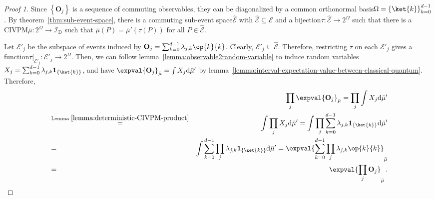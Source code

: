 \documentclass[12pt]{iopart}
\theoremstyle{plain}
\theoremstyle{definition}
\theoremstyle{remark}
\newcommand{\events}{\ensuremath{\mathcal{E}}}
\newcommand{\proj}[1]{\op{#1}{#1}}
\newcommand{\nb}{\nolinebreak[3] }
\begin{document}
\begin{proof}[Proof 1]Since $\left\{ \mathbf{O}_{j}\right\} $ is
a sequence of commuting observables, they can be diagonalized by a
common orthonormal basis\nb$\Omega=\left\{ \ket{k}\right\} _{k=0}^{d-1}$.
By theorem~\ref{thm:sub-event-space}, there is a commuting sub-event
space\nb$\widehat{\events}$ with $\widehat{\events}\subseteq\events$
and a bijection\nb$\tau:\widehat{\events}\rightarrow2^{\Omega}$
such that there is a CIVPM\nb$\bar{\mu}:2^{\Omega}\rightarrow\mathscr{I}_{\mathrm{D}}$
such that $\bar{\mu}\left(P\right)=\bar{\mu}'\left(\tau\left(P\right)\right)$
for all $P\in\widehat{\events}$.

Let $\events'_{j}$ be the subspace of events induced by $\mathbf{O}_{j}=\sum_{k=0}^{d-1}\lambda_{j,k}\proj{k}$.
Clearly, $\events'_{j}\subseteq\widehat{\events}$. Therefore, restricting
$\tau$ on each $\events'_{j}$ gives a function\nb$\tau|_{\events'_{j}}:\events'_{j}\rightarrow2^{\Omega}$.
Then, we can follow lemma~\ref{lemma:observable2random-variable}
to induce random variables\nb$X_{j}=\sum_{k=0}^{d-1}\lambda_{j,k}\mathbf{1}_{\left\{ \ket{k}\right\} }$,
and have $\expval{\mathbf{O}_{j}}_{\bar{\mu}}=\int X_{j}\rmd\bar{\mu}'$
by lemma~\ref{lemma:interval-expectation-value-between-classical-quantum}.
Therefore, 
\begin{eqnarray*}
 &  & \prod_{j}\expval{\mathbf{O}_{j}}_{\bar{\mu}}=\prod_{j}\int X_{j}\rmd\bar{\mu}'\\
 & \stackrel{\textrm{Lemma }\ref{lemma:deterministic-CIVPM-product}}{=} & \int\prod_{j}X_{j}\rmd\bar{\mu}'=\int\prod_{j}\sum_{k=0}^{d-1}\lambda_{j,k}\mathbf{1}_{\left\{ \ket{k}\right\} }\rmd\bar{\mu}'\\
 & = & \int\sum_{k=0}^{d-1}\prod_{j}\lambda_{j,k}\mathbf{1}_{\left\{ \ket{k}\right\} }\rmd\bar{\mu}'=\expval{\sum_{k=0}^{d-1}\prod_{j}\lambda_{j,k}\proj{k}}_{\bar{\mu}}\\
 & = & \expval{\prod_{j}\mathbf{O}_{j}}_{\bar{\mu}}\,.
\end{eqnarray*}
\end{proof}
\end{document}
